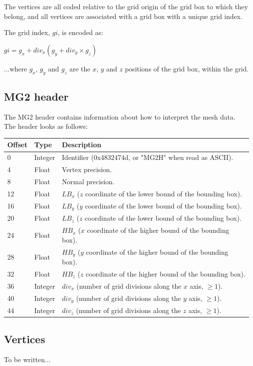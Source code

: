 The vertices are all coded relative to the grid origin of the grid box to which
they belong, and all vertices are associated with a grid box with a unique
grid index.

The grid index, $gi$, is encoded as:

$gi = g_x + div_x(g_y + div_y \times g_z)$

...where $g_x$, $g_y$ and $g_z$ are the $x$, $y$ and $z$ positions of the grid
box, within the grid.

\subsection{MG2 header}
The MG2 header contains information about how to interpret the mesh data. The
header looks as follows:

\begin{tabular}{|l|l|l|}\hline
\textbf{Offset} &  \textbf{Type} & \textbf{Description}\\ \hline
0 & Integer & Identifier (0x4832474d, or "MG2H" when read as ASCII).\\ \hline
4 & Float & Vertex precision.\\ \hline
8 & Float & Normal precision.\\ \hline
12 & Float & $LB_x$ ($z$ coordinate of the lower bound of the bounding box).\\ \hline
16 & Float & $LB_y$ ($y$ coordinate of the lower bound of the bounding box).\\ \hline
20 & Float & $LB_z$ ($z$ coordinate of the lower bound of the bounding box).\\ \hline
24 & Float & $HB_x$ ($x$ coordinate of the higher bound of the bounding box).\\ \hline
28 & Float & $HB_y$ ($y$ coordinate of the higher bound of the bounding box).\\ \hline
32 & Float & $HB_z$ ($z$ coordinate of the higher bound of the bounding box).\\ \hline
36 & Integer & $div_x$ (number of grid divisions along the $x$ axis, $\geq 1$).\\ \hline
40 & Integer & $div_y$ (number of grid divisions along the $y$ axis, $\geq 1$).\\ \hline
44 & Integer & $div_z$ (number of grid divisions along the $z$ axis, $\geq 1$).\\ \hline
\end{tabular}


\subsection{Vertices}
To be written...

